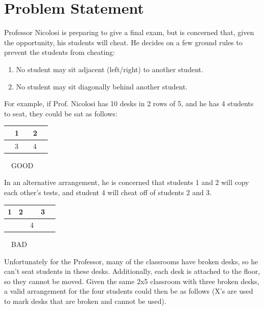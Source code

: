 \documentclass[11pt]{article}
\begin{document}
\pagestyle{fancy}


\section{Problem Statement}

Professor Nicolosi is preparing to give a final exam, but is concerned that,
given the opportunity, his students will cheat. He decides on a few ground
rules to prevent the students from cheating:
\begin{enumerate}
\item No student may sit adjacent (left/right) to another student.
\item No student may sit diagonally behind another student.
\end{enumerate}
\smallskip
For example, if Prof. Nicolosi has 10 desks in 2 rows of 5,
and he has 4 students to seat, they could be sat as follows:

\begin{center}
\setlength{\tabcolsep}{8pt}
\renewcommand{\arraystretch}{1.5}
\begin{tabular}{ | m{6pt} | m{6pt} | m{6pt} | m{6pt} | m{6pt} | }
		\hline
 		& 1 & & 2 & \\ \hline
		& 3 & & 4 & \\
 		\hline
\end{tabular} \ \ GOOD
\end{center}
\smallskip
In an alternative arrangement, he is concerned that students 1 and 2 will copy
each other's tests, and student 4 will cheat off of students 2 and 3.

\begin{center}
\setlength{\tabcolsep}{8pt}
\renewcommand{\arraystretch}{1.5}
\begin{tabular}{ | m{6pt} | m{6pt} | m{6pt} | m{6pt} | m{6pt} | }
		\hline
 		1 & 2 & & 3 & \\ \hline
		& & 4 & & \\
 		\hline
\end{tabular} \ \ BAD
\end{center}
\bigskip
Unfortunately for the Professor, many of the classrooms have broken desks,
so he can't seat students in these desks. Additionally, each desk
is attached to the floor, so they cannot be moved. Given the same 2x5 classroom
with three broken desks, a valid arrangement for the four students could then be
as follows (X's are used to mark desks that are broken and cannot be used).
\end{document}

